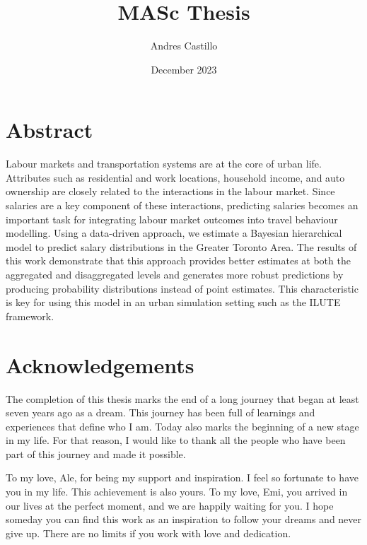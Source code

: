 \documentclass[twoside, 12pt]{report}
\title{MASc Thesis}
\author{Andres Castillo}
\date{December 2023}
\begin{document}
\begin{sloppypar}



\chapter*{Abstract}
\begin{spacing}{2}
Labour markets and transportation systems are at the core of urban life. Attributes such as residential and work locations, household income, and auto ownership are closely related to the interactions in the labour market. Since salaries are a key component of these interactions, predicting salaries becomes an important task for integrating labour market outcomes into travel behaviour modelling. Using a data-driven approach, we estimate a Bayesian hierarchical model to predict salary distributions in the Greater Toronto Area. The results of this work demonstrate that this approach provides better estimates at both the aggregated and disaggregated levels and generates more robust predictions by producing probability distributions instead of point estimates. This characteristic is key for using this model in an urban simulation setting such as the ILUTE framework. 
\end{spacing}


\chapter*{Acknowledgements}
\vspace{-1cm}
The completion of this thesis marks the end of a long journey that began at least seven years ago as a dream. This journey has been full of learnings and experiences that define who I am. Today also marks the beginning of a new stage in my life. For that reason, I would like to thank all the people who have been part of this journey and made it possible.

To my love, Ale, for being my support and inspiration. I feel so fortunate to have you in my life. This achievement is also yours. To my love, Emi, you arrived in our lives at the perfect moment, and we are happily waiting for you. I hope someday you can find this work as an inspiration to follow your dreams and never give up. There are no limits if you work with love and dedication.


\end{sloppypar}
\end{document}
